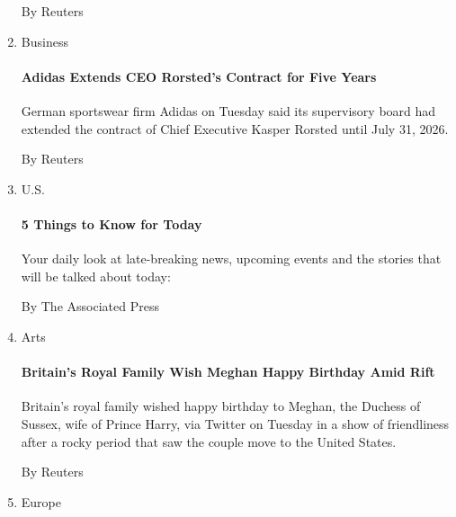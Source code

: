 \begin{enumerate}
  By Reuters
\item
  Business

  \href{/reuters/2020/08/04/business/04reuters-adidas-ceo.html?searchResultPosition=6}{}

  \hypertarget{adidas-extends-ceo-rorsteds-contract-for-five-years}{%
  \paragraph{Adidas Extends CEO Rorsted's Contract for Five
  Years}\label{adidas-extends-ceo-rorsteds-contract-for-five-years}}

  German sportswear firm Adidas on Tuesday said its supervisory board
  had extended the contract of Chief Executive Kasper Rorsted until July
  31, 2026.

  By Reuters
\item
  U.S.

  \href{/aponline/2020/08/04/us/ap-5-things-to-know-today.html?searchResultPosition=7}{}

  \hypertarget{5-things-to-know-for-today}{%
  \paragraph{5 Things to Know for
  Today}\label{5-things-to-know-for-today}}

  Your daily look at late-breaking news, upcoming events and the stories
  that will be talked about today:

  By The Associated Press
\item
  Arts

  \href{/reuters/2020/08/04/arts/04reuters-britain-royals-meghan.html?searchResultPosition=8}{}

  \hypertarget{britains-royal-family-wish-meghan-happy-birthday-amid-rift}{%
  \paragraph{Britain's Royal Family Wish Meghan Happy Birthday Amid
  Rift}\label{britains-royal-family-wish-meghan-happy-birthday-amid-rift}}

  Britain's royal family wished happy birthday to Meghan, the Duchess of
  Sussex, wife of Prince Harry, via Twitter on Tuesday in a show of
  friendliness after a rocky period that saw the couple move to the
  United States.

  By Reuters
\item
  Europe


\end{enumerate}
